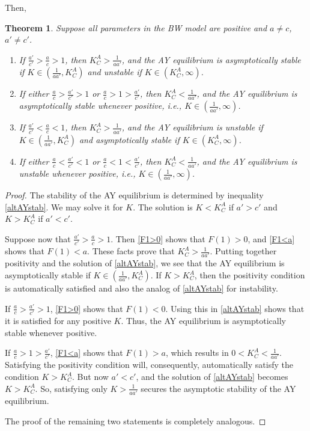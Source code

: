 \documentclass[12pt]{article}
\newtheorem{theorem}{Theorem}[section]
\theoremstyle{definition}
\begin{document}
Then,
\begin{theorem} \label{theogtAY}
	Suppose all parameters in the BW model are positive and $a \neq c$, $a' \neq c'$. 
	\begin{enumerate}
		\item If $\frac{a'}{c'}>\frac{a}{c}>1$, then $K^A_C>\frac{1}{a a'}$, and the AY equilibrium is asymptotically stable if $K \in (\frac{1}{a a'}, K^A_C)$ and unstable if $K \in (K^A_C, \infty)$.
		\item If either $\frac{a}{c}>\frac{a'}{c'}>1$ or $\frac{a}{c}>1>\frac{a'}{c'}$, then $K^A_C<\frac{1}{a a'}$, and the AY equilibrium is asymptotically stable whenever positive, i.e., $K \in (\frac{1}{a a'}, \infty)$.
		\item If $\frac{a'}{c'}<\frac{a}{c}<1$, then $K^A_C>\frac{1}{a a'}$, and the AY equilibrium is unstable if $K \in (\frac{1}{a a'}, K^A_C)$ and asymptotically stable if $K \in (K^A_C, \infty)$.
		\item If either $\frac{a}{c}<\frac{a'}{c'}<1$ or $\frac{a}{c}<1<\frac{a'}{c'}$, then $K^A_C<\frac{1}{a a'}$, and the AY equilibrium is unstable whenever positive, i.e., $K \in (\frac{1}{a a'}, \infty)$.
	\end{enumerate}
\end{theorem}
\begin{proof}
	The stability of the AY equilibrium is determined by inequality \eqref{altAYstab}. We may solve it for $K$. The solution is $K<K^A_C$ if $a'>c'$ and $K>K^A_C$ if $a'<c'$.
	
	Suppose now that $\frac{a'}{c'}>\frac{a}{c}>1$. Then \eqref{F1>0} shows that $F(1)>0$, and \eqref{F1<a} shows that $F(1)<a$. These facts prove that $K^A_C>\frac{1}{a a'}$. Putting together positivity and the solution of \eqref{altAYstab}, we see that the AY equilibrium is asymptotically stable if $K \in (\frac{1}{a a'}, K^A_C)$. If $K>K^A_C$, then the positivity condition is automatically satisfied and also the analog of \eqref{altAYstab} for instability.
	
	If $\frac{a}{c}>\frac{a'}{c'}>1$, \eqref{F1>0} shows that $F(1)<0$. Using this in \eqref{altAYstab} shows that it is satisfied for any positive $K$. Thus, the AY equilibrium is asymptotically stable whenever positive.
	
	If $\frac{a}{c}>1>\frac{a'}{c'}$, \eqref{F1<a} shows that $F(1)>a$, which results in $0<K_C^A<\frac{1}{a a'}$. Satisfying the positivity condition will, consequently, automatically satisfy the condition $K>K^A_C$. But now $a'<c'$, and the solution of \eqref{altAYstab} becomes $K>K^A_C$. So, satisfying only $K>\frac{1}{a a'}$ secures the asymptotic stability of the AY equilibrium.
	
	The proof of the remaining two statements is completely analogous.    
\end{proof}
\end{document}

